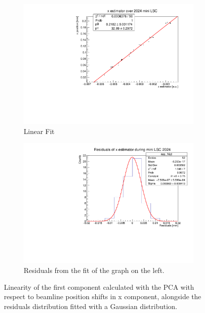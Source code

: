 \begin{figure}
    \centering
    \begin{subfigure}{0.48\textwidth}
    \includegraphics[width=\linewidth]{figures/x_res_new.pdf}
    \caption{Linear Fit}\label{fig:xfit_data}
    \end{subfigure}
    \begin{subfigure}{0.48\textwidth}
    \includegraphics[width=\linewidth]{figures/x_fit_new.pdf}
    \caption{Residuals from the fit of the graph on the left. }\label{fig:xres_data}
    \end{subfigure}
    \caption{Linearity of the first component calculated with the PCA with respect to beamline position shifts in x component, alongside the residuals distribution fitted with a Gaussian distribution.}
    \label{fig:x_data}
\end{figure}


